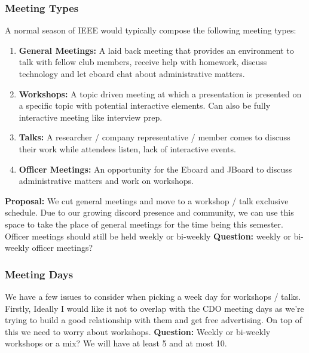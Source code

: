 \documentclass{article}
\begin{document}
\newpage
\subsubsection{Meeting Types}

A normal season of IEEE would typically compose the following meeting types:
\begin{enumerate}
    \item \textbf{General Meetings:} A laid back meeting that provides an environment to talk with fellow club members, receive help with homework, discuss technology and let eboard chat about administrative matters.
    \item \textbf{Workshops:} A topic driven meeting at which a presentation is presented on a specific topic with potential interactive elements. Can also be fully interactive meeting like interview prep.
    \item \textbf{Talks:} A researcher / company representative / member comes to discuss their work while attendees listen, lack of interactive events. 
    \item \textbf{Officer Meetings:}  An opportunity for the Eboard and JBoard to discuss administrative matters and work on workshops.   
\end{enumerate}
\vspace{2mm}\newline
\textbf{Proposal:} We cut general meetings and move to a workshop / talk exclusive schedule. Due to our growing discord presence and community, we can use this space to take the place of general meetings for the time being this semester. Officer meetings should still be held weekly or bi-weekly 
\vspace{2mm}\newline
\textbf{Question:} weekly or bi-weekly officer meetings?

\subsubsection{Meeting Days}
We have a few issues to consider when picking a week day for workshops / talks. Firstly, Ideally I would like it not to overlap with the CDO meeting days as we're trying to build a good relationship with them and get free advertising. On top of this we need to worry about workshops. 
\vspace{2mm}\newline
\textbf{Question:} Weekly or bi-weekly workshops or a mix? We will have at least 5 and at most 10.
\end{document}
